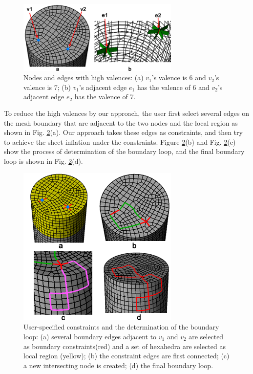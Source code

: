 \documentclass[final,5p,times,twocolumn]{elsarticle}
\begin{document}
\begin{figure}[htbp]
\begin{center}
\includegraphics[width=8cm]{exam2_input.png}
\caption{Nodes and edges with high valences: (a) $v_1$'s valence is 6 and $v_2$'s valence is 7; (b) $v_1$'s adjacent edge $e_1$ has the valence of 6 and $v_2$'s adjacent edge $e_2$ has the valence of 7.}
\label{fig:exam2_input}
\end{center}
\end{figure}

To reduce the high valences by our approach, the user first select several edges on the mesh boundary that are adjacent to the two nodes and the local region as shown in Fig. \ref{fig:exam2_bound_loop}(a). Our approach takes these edges as constraints, and then try to achieve the sheet inflation under the constraints. Figure \ref{fig:exam2_bound_loop}(b) and Fig. \ref{fig:exam2_bound_loop}(c) show the process of determination of the boundary loop, and the final boundary loop is shown in Fig. \ref{fig:exam2_bound_loop}(d).

\begin{figure}[htbp]
\begin{center}
\includegraphics[width=8cm]{exam2_bound_loop.png}
\caption{User-specified constraints and the determination of the boundary loop: (a) several boundary edges adjacent to $v_1$ and $v_2$ are selected as boundary constraints(red) and a set of hexahedra are selected as local region (yellow); (b) the constraint edges are first connected; (c) a new intersecting node is created; (d) the final boundary loop.}
\label{fig:exam2_bound_loop}
\end{center}
\end{figure}
\end{document}
